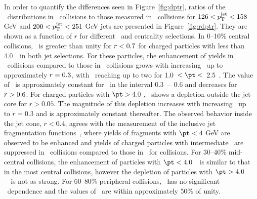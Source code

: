 In order to quantify the differences seen in Figure~\ref{fig:dptr}, ratios of the \Dptr\ distributions in \pbpb\ collisions
to those measured in \pp\ collisions for $126 < \mbox{$p_{\mathrm{T}}^{\mathrm{jet}}$} < 158$ GeV and $200 < \mbox{$p_{\mathrm{T}}^{\mathrm{jet}}$} < 251$ GeV jets 
are presented in Figure~\ref{fig:rdptr}. They are shown as a function of $r$ for different \pt\ and centrality selections. In 0--10\% central collisions,
\RDptr\ is greater than unity for $\mbox{$r$} < 0.7$ for charged particles with \pT less than 4.0~\GeV\ in both jet selections. 
For these particles, the enhancement of yields in \pbpb\ collisions compared to those in  \pp\ 
collisions grows with increasing \rvar\ up to approximately \mbox{$\mbox{$r$}  = 0.3$}, with \RDptr\ reaching up to two for
1.0~$< \pt <$~2.5~\GeV.
The value of \RDptr\ is approximately constant for \rvar\ in the interval \mbox{0.3 -- 0.6} and decreases for \mbox{$\mbox{$r$} > 0.6$}.  For charged particles with $\pt > 4.0$ \GeV, \RDptr\ shows a depletion outside the jet core for $r > 0.05$. The magnitude of this depletion increases with increasing \rvar\ up to $r = 0.3$ and is approximately constant thereafter.
 The observed behavior inside the jet cone, $r < 0.4$, agrees with the measurement of the inclusive jet fragmentation functions~\cite{Aaboud:2017eww,Aaboud:2018hpb}, where yields of fragments with $\pt < 4$ GeV are observed to be enhanced and yields of charged particles with intermediate \pT\ are suppressed in \PbPb\ collisions compared to those in \pp\ for collisions. 
 For 30--40\% mid-central collisions, the enhancement of particles with $\pt < 4.0$~\GeV\ is similar to that in the most central 
 collisions, however the depletion of particles with $\pt > 4.0$~\GeV\ is not as strong.
For 60--80\% peripheral collisions, \RDptr\ has no significant \rvar\ dependence and the values of \RDptr\ are within approximately 50\% of unity.

